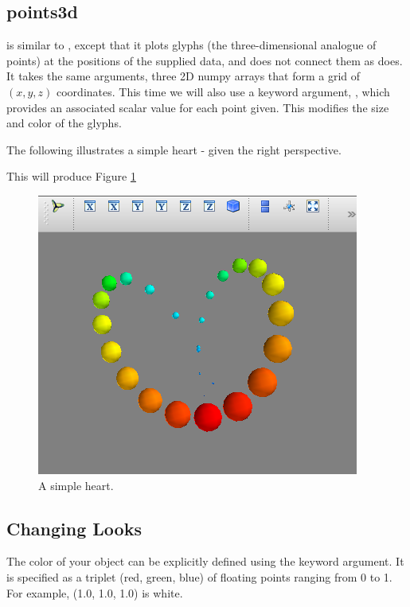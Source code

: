 \subsection*{points3d}
 is similar to , except that it plots glyphs (the three-dimensional analogue of points) at the 
positions of the supplied data, and does not connect them as  does. It takes the same arguments, three 2D numpy arrays that form a grid of $(x,y,z)$ coordinates. This time we 
will also use a keyword argument, , which provides an associated scalar 
value for each point given. This modifies the size and color of the glyphs. 

The following illustrates a simple heart - given the right perspective. 



This will produce Figure \ref{mayavi:points3d.pdf}

\begin{figure} 
\includegraphics[width=\textwidth]{points3d.pdf}
\caption{A simple heart. } 
\label{mayavi:points3d.pdf}
\end{figure}

\subsection*{Changing Looks}
The color of your object can be explicitly defined using the  
keyword argument. It is specified as a triplet (red, green, blue) of 
floating points ranging from 0 to 1. 
For example, (1.0, 1.0, 1.0) is white. 

